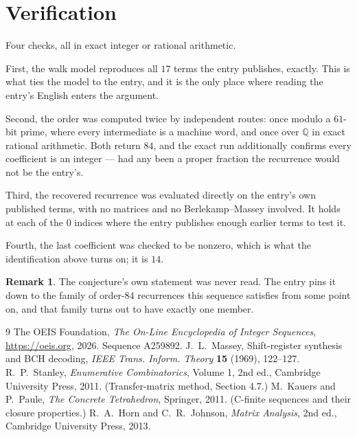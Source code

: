 \documentclass[11pt,a4paper]{article}
\theoremstyle{plain}
\theoremstyle{definition}
\newtheorem{remark}[theorem]{Remark}
\begin{document}
\section{Verification}

Four checks, all in exact integer or rational arithmetic.

First, the walk model reproduces all $17$ terms the entry publishes, exactly. This is
what ties the model to the entry, and it is the only place where reading the entry's English
enters the argument.

Second, the order was computed twice by independent routes: once modulo a $61$-bit prime, where
every intermediate is a machine word, and once over $\mathbb{Q}$ in exact rational arithmetic.
Both return $84$, and the exact run additionally confirms every coefficient is an integer
--- had any been a proper fraction the recurrence would not be the entry's.

Third, the recovered recurrence was evaluated directly on the entry's own published terms, with
no matrices and no Berlekamp--Massey involved. It holds at each of the $0$ indices where
the entry publishes enough earlier terms to test it.

Fourth, the last coefficient was checked to be nonzero, which is what the identification above
turns on; it is $14$.

\begin{remark}
The conjecture's own statement was never read. The entry pins it down to the family of
order-$84$ recurrences this sequence satisfies from some point on, and that family turns
out to have exactly one member.
\end{remark}

\begin{thebibliography}{9}
 The OEIS Foundation, \emph{The On-Line Encyclopedia of Integer
Sequences}, \url{https://oeis.org}, 2026. Sequence A259892.
 J.~L.~Massey, Shift-register synthesis and BCH decoding, \emph{IEEE
Trans. Inform. Theory} \textbf{15} (1969), 122--127.
 R.~P.~Stanley, \emph{Enumerative Combinatorics}, Volume 1, 2nd ed.,
Cambridge University Press, 2011. (Transfer-matrix method, Section 4.7.)
 M.~Kauers and P.~Paule, \emph{The Concrete Tetrahedron}, Springer, 2011.
(C-finite sequences and their closure properties.)
 R.~A.~Horn and C.~R.~Johnson, \emph{Matrix Analysis}, 2nd ed., Cambridge
University Press, 2013.
\end{thebibliography}
\end{document}
